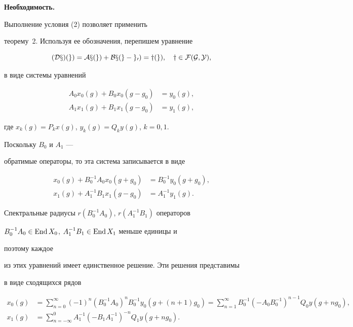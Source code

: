 \begin{pf}{\bf Необходимость.}


Выполнение условия (2) позволяет применить 


теорему~2. Используя ее обозначения, перепишем уравнение 


$$ 


(\cal D x)(g)=A x(g)+B x(g-g_0)=y(g),\quad y\in\cal F(G,Y), 


$$ 


в виде системы уравнений 


\begin{align*} 


A_0x_0(g)+B_0x_0(g-g_0)&=y_0(g),\\ 


A_1x_1(g)+B_1x_1(g-g_0)&=y_1(g), 


\end{align*} 


где $x_k(g)=P_k x(g)$, $y_k(g)=Q_k y(g)$, $k=0,1$. 


Поскольку $B_0$ и $A_1$ --- 


обратимые операторы, то эта система записывается в виде 


\begin{align*} 


x_0(g)+B^{-1}_0A_0x_0(g+g_0)&=B^{-1}_0y_0(g+g_0),\\ 


x_1(g)+A^{-1}_1B_1x_1(g-g_0)&=A^{-1}_1y_1(g). 


\end{align*} 


Спектральные радиусы $r(B^{-1}_0A_0)$, $r(A^{-1}_1B_1)$ операторов 


$B^{-1}_0A_0\in\operatorname{End} X_0$, $A^{-1}_1B_1\in\operatorname{End} X_1$ меньше единицы и 


поэтому каждое 


из этих уравнений имеет единственное решение. Эти решения представимы 


в виде сходящихся рядов 


\begin{align*} 


x_0(g)&=\sum^\infty_{n=0}(-1)^n(B^{-1}_0A_0)^n B^{-1}_0 


y_0(g+(n+1)g_0)=\sum^\infty_{n=1}B^{-1}_0(-A_0B^{-1}_0)^{n-1} 


Q_0y(g+n g_0), \\ 


x_1(g)&=\sum^0_{n=-\infty}A^{-1}_1(-B_1A^{-1}_1)^{-n} 


Q_1y(g+n g_0). 



\end{align*}
\end{pf}
